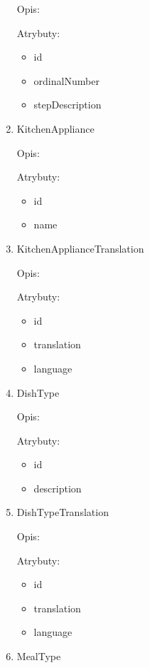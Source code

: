 \begin{enumerate}[label={\textbf{KAT/\protect\threedigits{\theenumi}}}, wide, labelwidth=!, labelindent=0pt]
    Opis: \lipsum[1]
    \par
    Atrybuty:
    \begin{itemize}
        \item id
        \item ordinalNumber
        \item stepDescription
    \end{itemize}

    \item \label{kat:KitchenAppliance} KitchenAppliance

    Opis: \lipsum[1]
    \par
    Atrybuty:
    \begin{itemize}
        \item id
        \item name
    \end{itemize}

    \item \label{kat:KitchenApplianceTranslation} KitchenApplianceTranslation

    Opis: \lipsum[1]
    \par
    Atrybuty:
    \begin{itemize}
        \item id
        \item translation
        \item language
    \end{itemize}

    \item \label{kat:DishType} DishType

    Opis: \lipsum[1]
    \par
    Atrybuty:
    \begin{itemize}
        \item id
        \item description
    \end{itemize}

    \item \label{kat:DishTypeTranslation} DishTypeTranslation

    Opis: \lipsum[1]
    \par
    Atrybuty:
    \begin{itemize}
        \item id
        \item translation
        \item language
    \end{itemize}

    \item \label{kat:MealType} MealType


\end{enumerate}
